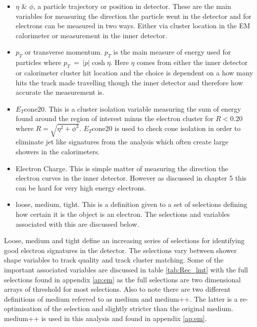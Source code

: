 	\begin{itemize}
	\item $\eta$ \& $\phi$, a particle trajectory or position in detector. These are the main variables for measuring the direction the particle went in the detector and for electrons can be measured in two ways. Either via cluster location in the EM calorimeter or measurement in the inner detector.
	\item $p_{T}$ or transverse momentum. $p_{T}$ is the main measure of energy used for particles where $p_{T}~=~|p|\cosh{\eta}$. Here $\eta$ comes from either the inner detector or calorimeter cluster hit location and the choice is dependent on a how many hits the track made travelling though the inner detector and therefore how accurate the measurement is.
	\item $E_{T}$cone20. This is a cluster isolation variable measuring the sum of energy found around the region of interest minus the electron cluster for $R < 0.20$ where $R = \sqrt{\eta^{2} + \phi^{2}}$. $E_{T}$cone20 is used to check cone isolation in order to eliminate jet like signatures from the analysis which often create large showers in the calorimeters.
	\item Electron Charge. This is simple matter of measuring the direction the electron curves in the inner detector. However as discussed in chapter 5 this can be hard for very high energy electrons.
	\item loose, medium, tight. This is a definition given to a set of selections defining how certain it is the object is an electron. The selections and variables associated with this are discussed below.
	\end{itemize}

	Loose, medium and tight define an increasing series of selections for identifying good electron signatures in the detector. The selections vary between shower shape variables to track quality and track cluster matching. Some of the important associated variables are discussed in table \ref{tab:Rec_lmt} with the full selections found in appendix \ref{ap:em} as the full selections are two dimensional arrays of threshold for most selections. Also to note there are two different definitions of medium referred to as medium and medium++. The latter is a re-optimisation of the selection and slightly stricter than the original medium. medium++ is used in this analysis and found in appendix \ref{ap:em}.

